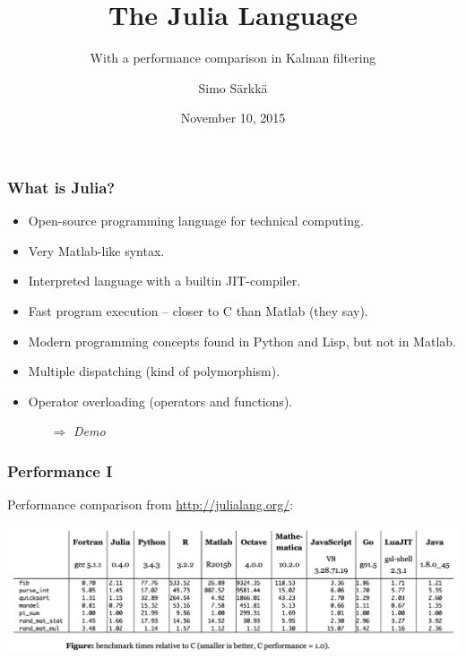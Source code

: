 \documentclass[xcolor=svgnames,english,presentation]{beamer}
\title{The Julia Language}
\subtitle{With a performance comparison in Kalman filtering}
\author{Simo S\"arkk\"a}
\institute{Aalto University} %
\date{November 10, 2015}
\begin{document}

\begin{frame}
  \titlepage
\end{frame}



\begin{frame}
  \frametitle{What is Julia?}

  \begin{itemize}[<+->]       
  \item Open-source \alert{programming language} for technical computing.
  \item Very \alert{Matlab-like} syntax.
  \item Interpreted language with a builtin \alert{JIT-compiler}.
  \item \alert{Fast program execution} -- closer to C than Matlab (they say).
  \item \alert{Modern programming concepts} found in Python and Lisp, but not in Matlab.
  \item \alert{Multiple dispatching} (kind of polymorphism).
  \item \alert{Operator overloading} (operators and functions).
  \begin{itemize}[<+->]       
  \item[$\Rightarrow$] {\it Demo}
  \end{itemize}
  \end{itemize}

\end{frame}

\begin{frame}
  \frametitle{Performance I}
  \centering
  Performance comparison from \url{http://julialang.org/}: 

  \vspace{0.5cm}

  \includegraphics[width=\textwidth]{perf}
\end{frame}
\end{document}
